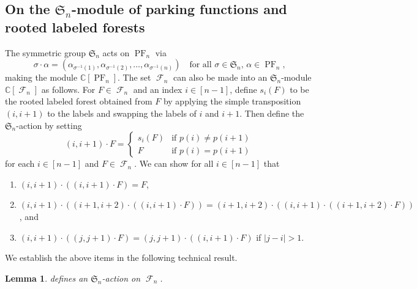 \documentclass{amsart}
\renewcommand{\S}{\mathfrak{S}}
\newcommand{\CC}{\mathbb{C}}
\DeclareMathOperator{\PF}{PF}
\DeclareMathOperator{\F}{\mathcal{F}}
\newtheorem{lemma}[theorem]{Lemma}
\theoremstyle{definition}
\begin{document}
\subsection{On the \texorpdfstring{$\S_n$}{}-module of parking functions and rooted labeled forests}
The symmetric group $\S_n$ acts on $\PF_n$ via 
\[\sigma\cdot \alpha  =(\alpha_{\sigma^{-1}(1)},\alpha_{\sigma^{-1}(2)},\dots,\alpha_{\sigma^{-1}(n)}) \quad \text{for all $\sigma\in \S_n$, $\alpha\in \PF_n$,} \]
making the module $\CC[\PF_n]$. The set $\F_n$ can also be made into an $\S_n$-module $\CC[\F_n]$ as follows. 
For $F\in \F_n$ and an index $i\in [n-1]$, define $s_i(F)$ to be the rooted labeled forest obtained from $F$ by applying the simple transposition $(i,i+1)$ to the labels and swapping the labels of $i$ and $i+1$. Then define the $\S_n$-action by setting
\begin{equation}\label{def: sn action on forests}
    (i,i+1)\cdot F=\begin{cases}
       s_i(F)&\mbox{if }p(i)\neq p(i+1)\\
       F&\mbox{if }p(i)=p(i+1)
    \end{cases}
\end{equation}
for each $i\in [n-1]$ and $F\in \F_n$. 
We can show for all $i\in [n-1]$ that
\begin{enumerate}
     \item $ (i,i+1)\cdot ( (i,i+1)\cdot F)=F$,
     \item $ (i,i+1)\cdot ( (i+1,i+2)\cdot ( (i,i+1)\cdot F))= (i+1,i+2)\cdot ( (i,i+1)\cdot ( (i+1,i+2)\cdot F))$, and
     \item $(i,i+1)\cdot ((j,j+1)\cdot F)=(j,j+1)\cdot ((i,i+1)\cdot F)$ if $|j-i|>1$.
 \end{enumerate}
We establish the above items in the following  technical result.
\begin{lemma}
     defines an $\S_n$-action on $\F_n$.
\end{lemma}
\end{document}
